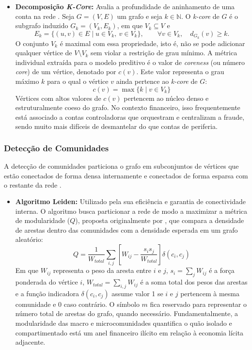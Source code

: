 \documentclass[titlepage,a4paper,oneside,onecolumn,12pt]{report}
\begin{document}
\begin{itemize}
\item \textbf{Decomposição \textit{K-Core}:} Avalia a profundidade de aninhamento de uma conta na rede \cite{shin2016corescope, shin2018patterns, conte2024kcores}. Seja $G=(V,E)$ um grafo e seja $k \in \mathbb{N}$. O \textit{k-core} de $G$ é o subgrafo induzido $G_k=(V_k,E_k)$, em que $V_k \subseteq V$ e
\begin{equation}
    E_k = \{(u,v) \in E \mid u \in V_k,\ v \in V_k\},
    \qquad \forall v \in V_k,\quad d_{G_k}(v) \ge k.
\end{equation}
O conjunto $V_k$ é maximal com essa propriedade, isto é, não se pode adicionar qualquer vértice de $V \setminus V_k$ sem violar a restrição de grau mínimo. A métrica individual extraída para o modelo preditivo é o valor de \textit{coreness} (ou número \textit{core}) de um vértice, denotado por $c(v)$. Este valor representa o grau máximo $k$ para o qual o vértice $v$ ainda pertence ao \textit{k-core} de $G$:
\begin{equation}
    c(v) = \max \{ k \mid v \in V_k \}
\end{equation}
Vértices com altos valores de $c(v)$ pertencem ao núcleo denso e estruturalmente coeso do grafo. No contexto financeiro, isso frequentemente está associado a contas controladoras que orquestram e centralizam a fraude, sendo muito mais difíceis de desmantelar do que contas de periferia.
\end{itemize}

\subsubsection{Detecção de Comunidades}
A detecção de comunidades particiona o grafo em subconjuntos de vértices que estão conectados de forma densa internamente e conectados de forma esparsa com o restante da rede \cite{liu2019evaluation}.
\begin{itemize}
\item \textbf{Algoritmo Leiden:} Utilizado pela sua eficiência e garantia de conectividade interna. O algoritmo busca particionar a rede de modo a maximizar a métrica de modularidade ($Q$), proposta originalmente por , que compara a densidade de arestas dentro das comunidades com a densidade esperada em um grafo aleatório:
\begin{equation}
    Q = \frac{1}{W_{total}} \sum_{i,j} \left[ W_{ij} - \frac{s_i s_j}{W_{total}} \right] \delta(c_i, c_j)
\end{equation}
Em que $W_{ij}$ representa o peso da aresta entre $i$ e $j$, $s_i=\sum_j W_{ij}$ é a força ponderada do vértice $i$, $W_{total}=\sum_{i,j}W_{ij}$ é a soma total dos pesos das arestas e a função indicadora $\delta(c_i, c_j)$ assume valor 1 se $i$ e $j$ pertencem à mesma comunidade e 0 caso contrário. O símbolo $m$ fica reservado para representar o número total de arestas do grafo, quando necessário. Fundamentalmente, a modularidade das macro e microcomunidades quantifica o quão isolado e compartimentado está um anel financeiro ilícito em relação à economia lícita adjacente.
\end{itemize}
\end{document}
